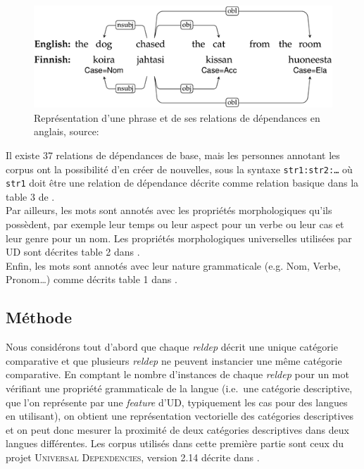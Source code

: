 \documentclass{cours}
\begin{document}
\begin{figure}[H]
	\centering
	\includegraphics[width=\textwidth]{Figures/Visualisations/simplified_ud_annotation}
	\caption{Représentation d'une phrase et de ses relations de dépendances en anglais, source:\cite{UDv2}}
\end{figure}

Il existe 37 relations de dépendances de base, mais les personnes annotant les corpus ont la possibilité d'en créer de nouvelles, sous la syntaxe \texttt{str1:str2:\dots} où \texttt{str1} doit être une relation de dépendance décrite comme relation basique dans la table 3 de \cite{UDv2}.\\
Par ailleurs, les mots sont annotés avec les propriétés morphologiques qu'ils possèdent, par exemple leur temps ou leur aspect pour un verbe ou leur cas et leur genre pour un nom.
Les propriétés morphologiques universelles utilisées par UD sont décrites table 2 dans \cite{UDv2}.\\
Enfin, les mots sont annotés avec leur nature grammaticale (e.g. Nom, Verbe, Pronom\dots) comme décrits table 1 dans \cite{UDv2}.

\subsection{Méthode}
Nous considérons tout d'abord que chaque \textit{reldep} décrit une unique catégorie comparative et que plusieurs \textit{reldep} ne peuvent instancier une même catégorie comparative.
En comptant le nombre d'instances de chaque \textit{reldep} pour un mot vérifiant une propriété grammaticale de la langue (i.e.\ une catégorie descriptive, que l'on représente par une \textit{feature} d'UD, typiquement les cas pour des langues en utilisant), on obtient une représentation vectorielle des catégories descriptives et on peut donc mesurer la proximité de deux catégories descriptives dans deux langues différentes.
Les corpus utilisés dans cette première partie sont ceux du projet \textsc{Universal Dependencies}, version 2.14 décrite dans \cite{UD214}.
\end{document}
